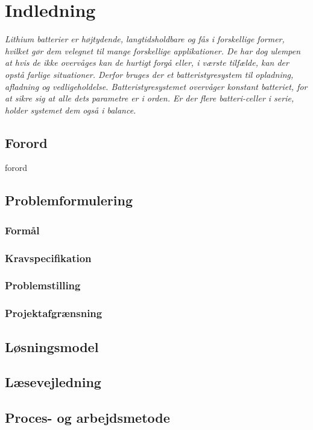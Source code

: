 \chapter{Indledning}

\emph{Lithium batterier er højtydende, langtidsholdbare og fås i forskellige former, hvilket gør dem velegnet til mange forskellige applikationer. De har dog ulempen at hvis de ikke overvåges kan de hurtigt forgå eller, i værste tilfælde, kan der opstå farlige situationer. Derfor bruges der et batteristyresystem til opladning, afladning og vedligeholdelse. Batteristyresystemet overvåger konstant batteriet, for at sikre sig at alle dets parametre er i orden. Er der flere batteri-celler i serie, holder systemet dem også i balance. }

\section{Forord}\label{sec:forord}
forord

\section{Problemformulering}


\subsection{Formål}


\subsection{Kravspecifikation} \label{afs:kravspecifikation}

\subsection{Problemstilling}

\subsection{Projektafgrænsning}

\section{Løsningsmodel}

\section{Læsevejledning}

\section{Proces- og arbejdsmetode}
